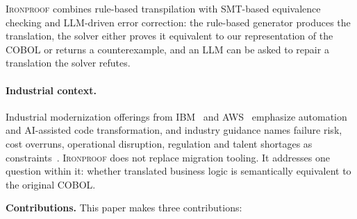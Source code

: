 \documentclass[sigconf,nonacm]{acmart}
\begin{document}
\textsc{Ironproof} combines rule-based transpilation with SMT-based equivalence checking and LLM-driven error correction: the rule-based generator produces the translation, the solver either proves it equivalent to our representation of the COBOL or returns a counterexample, and an LLM can be asked to repair a translation the solver refutes.

\paragraph{Industrial context.}
Industrial modernization offerings from IBM~\cite{ibm2024watsonx} and AWS~\cite{aws2023mainframe} emphasize automation and AI-assisted code transformation, and industry guidance names failure risk, cost overruns, operational disruption, regulation and talent shortages as constraints~\cite{deloitte2024banking}. \textsc{Ironproof} does not replace migration tooling. It addresses one question within it: whether translated business logic is semantically equivalent to the original COBOL.

\smallskip\noindent\textbf{Contributions.} This paper makes three contributions:
\end{document}

